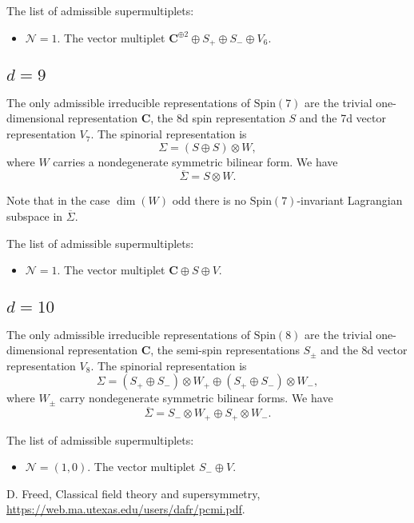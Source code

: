 \documentclass[12pt]{amsart}
\newcommand{\C}{\mathbf{C}}
\newcommand{\cN}{\mathcal{N}}
\newcommand{\Spin}{\mathrm{Spin}}
\theoremstyle{definition}
\theoremstyle{remark}
\begin{document}
The list of admissible supermultiplets:
\begin{itemize}
\item $\cN=1$. The vector multiplet $\C^{\oplus 2}\oplus S_+\oplus S_-\oplus V_6$.
\end{itemize}

\subsection{$d=9$}

The only admissible irreducible representations of $\Spin(7)$ are the trivial one-dimensional representation $\C$, the 8d spin representation $S$ and the 7d vector representation $V_7$. The spinorial representation is
\[\Sigma = (S\oplus S)\otimes W,\]
where $W$ carries a nondegenerate symmetric bilinear form. We have
\[\overline{\Sigma} = S\otimes W.\]

Note that in the case $\dim(W)$ odd there is no $\Spin(7)$-invariant Lagrangian subspace in $\overline{\Sigma}$.

The list of admissible supermultiplets:
\begin{itemize}
\item $\cN=1$. The vector multiplet $\C\oplus S\oplus V$.
\end{itemize}

\subsection{$d=10$}

The only admissible irreducible representations of $\Spin(8)$ are the trivial one-dimensional representation $\C$, the semi-spin representations $S_{\pm}$ and the 8d vector representation $V_8$. The spinorial representation is
\[\Sigma = (S_+\oplus S_-)\otimes W_+\oplus (S_+\oplus S_-)\otimes W_-,\]
where $W_{\pm}$ carry nondegenerate symmetric bilinear forms. We have
\[\overline{\Sigma} = S_-\otimes W_+\oplus S_+\otimes W_-.\]

The list of admissible supermultiplets:
\begin{itemize}
\item $\cN=(1, 0)$. The vector multiplet $S_-\oplus V$.
\end{itemize}

\begin{thebibliography}{Freed}
 D. Freed, Classical field theory and supersymmetry, \url{https://web.ma.utexas.edu/users/dafr/pcmi.pdf}.
\end{thebibliography}
\end{document}
